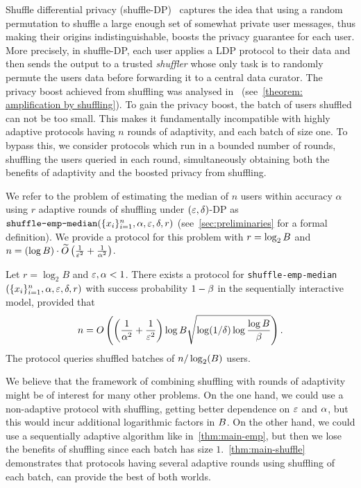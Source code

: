 Shuffle differential privacy (shuffle-DP)~\cite{bittau2017prochlo,Cheu19DDPS} captures the idea that using a random permutation to shuffle a large enough set of somewhat private user messages, thus making their origins indistinguishable, boosts the privacy guarantee for each user. 
More precisely, in shuffle-DP, each user applies a LDP protocol to their data and then sends the output to a trusted \emph{shuffler} whose only task is to randomly permute the users data before forwarding it to a central data curator.
The privacy boost achieved from shuffling was analysed in~\cite{feldman21shuffle} (see~\cref{theorem: amplification by shuffling}).
To gain the privacy boost, the batch of users shuffled can not be too small. This
%
makes it fundamentally incompatible with highly adaptive protocols having $n$ rounds of adaptivity, and each batch of size one. To bypass this, we consider protocols which run in a bounded number of rounds, shuffling the users queried in each round, simultaneously obtaining both the benefits of adaptivity and the boosted privacy from shuffling.

%

%
We refer to the problem of estimating the median of $n$ users within accuracy $\alpha$ using $r$ adaptive rounds of shuffling under $(\varepsilon,\delta)$-DP as $\texttt{shuffle-emp-median}(\{x_i\}_{i=1}^n,\alpha,\varepsilon,\delta,r)$ (see~\cref{sec:preliminaries} for a formal definition).
We provide a protocol for this problem with $r=\log_2B$ and $n=(\log B)\cdot\widetilde{O}\left(\frac{1}{\varepsilon^2}+\frac{1}{\alpha^2}\right)$.
\begin{theorem}
\label{thm:main-shuffle}
    Let $r=\log_2 B$ and $\varepsilon,\alpha<1$. There exists a protocol for \texttt{shuffle-emp-median}$(\{x_i\}_{i=1}^n,\alpha,\varepsilon,\delta,r)$ with success probability $1-\beta$ in the sequentially interactive model, provided that
    \[
    n=O\left( \left(\frac{1}{\alpha^2} +\frac{1}{\varepsilon^2}\right)\log B\sqrt{\log(1/\delta)\log\frac{\log B}{\beta}} \right).
    \]
    The protocol queries shuffled batches of $n/\log_2(B)$ users. 
\end{theorem}


We believe that the framework of combining shuffling with rounds of adaptivity might be of interest for many other problems. On the one hand, we could use a non-adaptive protocol with shuffling, getting better dependence on $\varepsilon$ and $\alpha$, but this would incur additional logarithmic factors in $B$. On the other hand, we could use a sequentially adaptive algorithm like in~\cref{thm:main-emp}, but then we lose the benefits of shuffling since each batch has size $1$.~\cref{thm:main-shuffle} demonstrates that protocols having several adaptive rounds using shuffling of each batch, can provide the best of both worlds.

